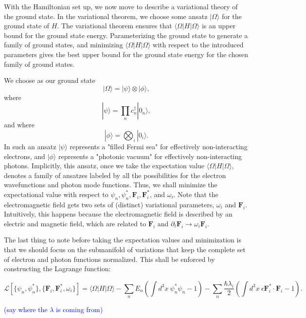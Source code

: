 \documentclass[aps,prb,onecolumn,
	groupedaddress,superscriptaddress,
	amsfonts,amssymb,amsmath,floatfix,
	citeautoscript]{revtex4-1}
\newcommand{\Jadd}[1]{\textcolor{blue}{#1}}
\begin{document}
With the Hamiltonian set up, we now move to describe a variational theory of the ground state. In the variational theorem, we choose some ansatz $|\Omega\rangle$ for the ground state of $H$. The variational theorem ensures that $\langle \Omega|H|\Omega\rangle$ is an upper bound for the ground state energy. Parameterizing the ground state to generate a family of ground states, and minimizing $\langle \Omega|H|\Omega\rangle$ with respect to the introduced parameters gives the best upper bound for the ground state energy for the chosen family of ground states. 

We choose as our ground state
\begin{equation}
|\Omega\rangle = |\psi\rangle \otimes |\phi\rangle,
\end{equation}
where
\begin{equation}
|\psi\rangle = \prod\limits_n c_n^{\dagger}|0_n\rangle,
\end{equation}
and where
\begin{equation}
|\phi\rangle = \bigotimes_i|0_i\rangle.
\end{equation}
In such an ansatz $|\psi\rangle$ represents a "filled Fermi sea" for effectively non-interacting electrons, and $|\phi\rangle$ represents a "photonic vacuum" for effectively non-interacting photons. Implicitly, this ansatz, once we take the expectation value $\langle \Omega|H|\Omega\rangle$, denotes a family of ansatzes labeled by all the possibilities for the electron wavefunctions and photon mode functions. Thus, we shall minimize the expectational value with respect to $\psi_n, \psi_n^*, \mathbf{F}_i, \mathbf{F}_i^*$, and $\omega_i$. Note that the electromagnetic field gets two sets of (distinct) variational parameters, $\omega_i$ and $\mathbf{F}_i$. Intuitively, this happens because the electromagnetic field is described by an electric and magnetic field, which are related to $\mathbf{F}_i$ and $\partial_t \mathbf{F}_i \rightarrow \omega_i\mathbf{F}_i$.

The last thing to note before taking the expectation values and minimization is that we should focus on the submanifold of variations that keep the complete set of electron and photon functions normalized. This shall be enforced by constructing the Lagrange function:
\begin{widetext}
\begin{equation}
\mathcal{L}[\{ \psi_n,\psi_n^* \},\{ \mathbf{F}_i,\mathbf{F}_i^*,\omega_i \}] = \langle \Omega |H|\Omega\rangle - \sum_n E_n\left(\int d^3x ~\psi_n^*\psi_n - 1 \right) - \sum_n \frac{\hbar\lambda_i}{2}\left(\int d^3x ~\epsilon\mathbf{F}_i^*\cdot\mathbf{F}_i - 1 \right).
\end{equation}
\end{widetext}
\Jadd{(say where the $\lambda$ is coming from)}
\end{document}
